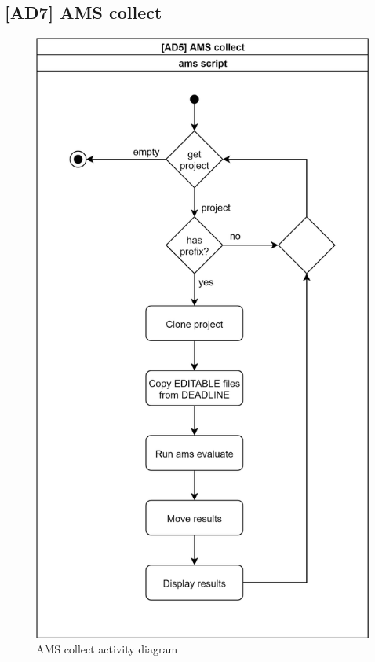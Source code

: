 \subsection{{[}AD7{]} AMS collect} \label{ssec:ad7}

\begin{figure}[H]
    \centering
    \includegraphics[width=\textwidth,height=\textheight,keepaspectratio]{Figures/ad/ad7.png}
    \caption{AMS collect activity diagram}
\end{figure}

